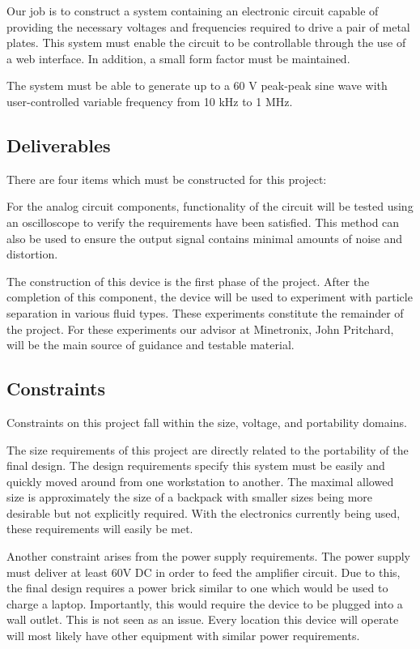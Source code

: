 \documentclass{article}	%
\begin{document}
\begin{multicols}{2}
Our job is to construct a system 
containing an electronic circuit capable of providing
the necessary voltages and frequencies required 
to drive a pair of metal plates.
This system must enable the circuit to be controllable 
through the use of a web interface.
In addition, a small form factor must be maintained.

The system must be able to generate up to a 60 V peak-peak sine wave with
user-controlled variable frequency from 10 kHz to 1 MHz. 

\subsection{Deliverables}
There are four items which must be constructed for this project:

For the analog circuit components,
functionality of the circuit will be tested
using an oscilloscope to verify 
the requirements have been satisfied.
This method can also be used to ensure 
the output signal contains minimal amounts of noise and distortion. 

The construction of this device is the first phase of the project.
After the completion of this component,
the device will be used 
to experiment with particle separation in various fluid types.
These experiments constitute the remainder of the project.
For these experiments our advisor at Minetronix, John Pritchard, 
will be the main source of guidance and testable material. 

\subsection{Constraints}
Constraints on this project fall within the size, voltage, and portability domains.

The size requirements of this project are directly related 
to the portability of the final design.
The design requirements specify this system must be easily and quickly
moved around from one workstation to another.
The maximal allowed size is approximately 
the size of a backpack 
with smaller sizes being more desirable
but not explicitly required.
With the electronics currently being used,
these requirements will easily be met.

Another constraint arises from the power supply requirements.
The power supply must deliver at least 60V DC in order to feed the amplifier circuit. 
Due to this, the final design requires a power brick
similar to one which would be used to charge a laptop.
Importantly, this would require the device to be plugged into a wall outlet.
This is not seen as an issue.
Every location this device will operate 
will most likely have other equipment with similar power requirements.


\end{multicols}
\end{document}
